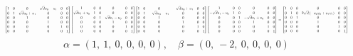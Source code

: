 \documentclass[11pt]{article}
\theoremstyle{definition}
\begin{document}
\[
\scaletoalign{\textwidth}{{\left[\begin{matrix}1 & 0 & 0 & \sqrt{d} u_{0} - u_{1} & 0 & 0\\0 & 1 & \sqrt{d} u_{0} + u_{1} & 0 & 0 & 0\\0 & 0 & 1 & 0 & 0 & 0\\0 & 0 & 0 & 1 & 0 & 0\\0 & 0 & 0 & 0 & 1 & 0\\0 & 0 & 0 & 0 & 0 & 1\end{matrix}\right]} {\left[\begin{matrix}1 & 0 & 0 & 0 & 0 & 0\\\sqrt{d} v_{1} + v_{0} & 1 & 0 & 0 & 0 & 0\\0 & 0 & 1 & \sqrt{d} v_{1} - v_{0} & 0 & 0\\0 & 0 & 0 & 1 & 0 & 0\\0 & 0 & 0 & 0 & 1 & 0\\0 & 0 & 0 & 0 & 0 & 1\end{matrix}\right]} {\left[\begin{matrix}1 & 0 & 0 & - \sqrt{d} u_{0} + u_{1} & 0 & 0\\0 & 1 & - \sqrt{d} u_{0} - u_{1} & 0 & 0 & 0\\0 & 0 & 1 & 0 & 0 & 0\\0 & 0 & 0 & 1 & 0 & 0\\0 & 0 & 0 & 0 & 1 & 0\\0 & 0 & 0 & 0 & 0 & 1\end{matrix}\right]} {\left[\begin{matrix}1 & 0 & 0 & 0 & 0 & 0\\- \sqrt{d} v_{1} - v_{0} & 1 & 0 & 0 & 0 & 0\\0 & 0 & 1 & - \sqrt{d} v_{1} + v_{0} & 0 & 0\\0 & 0 & 0 & 1 & 0 & 0\\0 & 0 & 0 & 0 & 1 & 0\\0 & 0 & 0 & 0 & 0 & 1\end{matrix}\right]} = {\left[\begin{matrix}1 & 0 & 0 & 0 & 0 & 0\\0 & 1 & 0 & 2 \sqrt{d} \left(- u_{0} v_{0} + u_{1} v_{1}\right) & 0 & 0\\0 & 0 & 1 & 0 & 0 & 0\\0 & 0 & 0 & 1 & 0 & 0\\0 & 0 & 0 & 0 & 1 & 0\\0 & 0 & 0 & 0 & 0 & 1\end{matrix}\right]}}
\]
\[
\alpha = \left( 1, \  1, \  0, \  0, \  0, \  0\right), \quad \beta = \left( 0, \  -2, \  0, \  0, \  0, \  0\right)
\]
\end{document}
